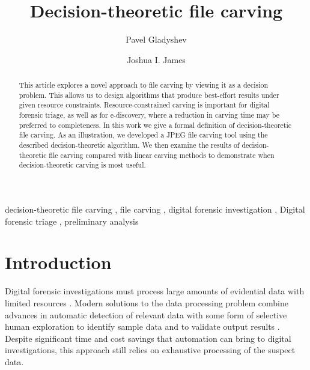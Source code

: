 \documentclass[final,5p,times,twocolumn,authoryear]{elsarticle}
\begin{document}
\begin{frontmatter}

\title{Decision-theoretic file carving}

\author[add1]{Pavel Gladyshev}
\author[add2]{Joshua I. James}
\address[add1]{Digital Forensics Investigation Research Laboratory, University College Dublin, Belfield, Dublin 4, Ireland}
\address[add2]{Digital Forensics Investigation Research Laboratory, Hallym University, 1 Hallimdaehak-gil, Chuncheon-si, Gangwon-do, South Korea}
\begin{abstract}
This article explores a novel approach to file carving by viewing it as a decision problem. This allows us to design algorithms that produce best-effort results under given resource constraints. Resource-constrained carving is important for digital forensic triage, as well as for e-discovery, where a reduction in carving time may be preferred to completeness. In this work we give a formal definition of decision-theoretic file carving. As an illustration, we developed a JPEG file carving tool using the described decision-theoretic algorithm. We then examine the results of decision-theoretic file carving compared with linear carving methods to demonstrate when decision-theoretic carving is most useful.
\end{abstract}

\begin{keyword}
decision-theoretic file carving \sep 
file carving \sep 
digital forensic investigation \sep 
Digital forensic triage \sep
preliminary analysis
\end{keyword}
\end{frontmatter}

\section{Introduction}

Digital forensic investigations must process large amounts of evidential data with limited resources \citep{Casey2009, pollitt2013triage}. Modern solutions to the data processing problem combine advances in automatic detection of relevant data with some form of selective human exploration to identify sample data and to validate output results \citep{marturana2013machine, schell2007cyber, james2014measuring}. Despite significant time and cost savings that automation can bring to digital investigations, this approach still relies on exhaustive processing of the suspect data.
\end{document}
